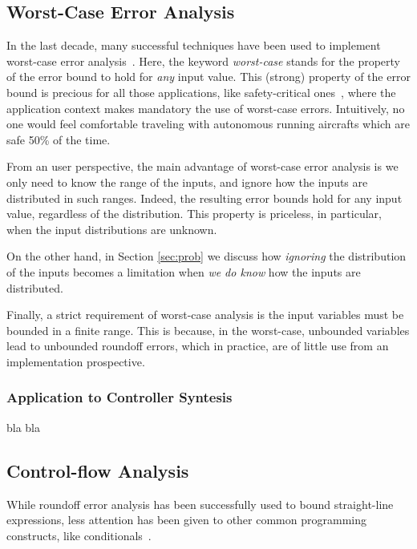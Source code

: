 \subsection{Worst-Case Error Analysis}
\label{sec:worst}
%
In the last decade, many successful techniques have been used to implement worst-case error analysis~\cite{darulova2018daisy,2015_fm_sjrg,solovyev2018rigorous,rosa,fptuner,smartfloat,satire,gappa,fluctuat}.
%
Here, the keyword \emph{worst-case} stands for the property of the error bound to hold for \emph{any} input value.
%
This (strong) property of the error bound is precious for all those applications, like safety-critical ones~\cite{guardstable, cpralg}, where the application context makes mandatory the use of worst-case errors.
%
Intuitively, no one would feel comfortable traveling with autonomous running aircrafts which are safe 50\% of the time.

%
From an user perspective, the main advantage of worst-case error analysis is we only need to know the range of the inputs, and ignore how the inputs are distributed in such ranges. 
%
Indeed, the resulting error bounds hold for any input value, regardless of the distribution.
%
%
This property is priceless, in particular, when the input distributions are unknown.
%

On the other hand, in Section \ref{sec:prob} we discuss how \emph{ignoring} the distribution of the inputs becomes a limitation when \emph{we do know} how the inputs are distributed.
%

Finally, a strict requirement of worst-case analysis is the input variables must be bounded  in a finite range. This is because, in the worst-case, unbounded variables lead to unbounded roundoff errors, which in practice, are of little use from an implementation prospective.
\subsubsection{Application to Controller Syntesis}
bla bla

\subsection{Control-flow Analysis}
%
While roundoff error analysis has been successfully used to bound straight-line expressions, less attention has been given to other common programming constructs, like conditionals~\cite{precisa, fluctuat}.
%

